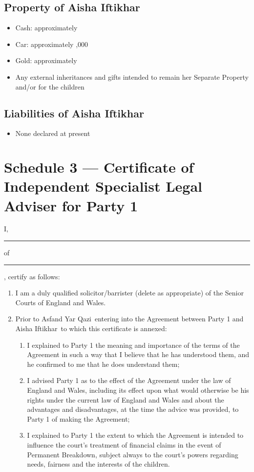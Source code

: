 \documentclass[10pt,a4paper]{article}
\newcommand{\PartyOne}{Asfand Yar Qazi}
\newcommand{\PartyTwo}{Aisha Iftikhar}
\begin{document}
\subsection*{Property of \PartyTwo}
\begin{itemize}[leftmargin=1.8em]
    \item Cash: approximately 
    \item Car: approximately ,000
    \item Gold: approximately 
    \item Any external inheritances and gifts intended to remain her Separate Property and/or for the children
\end{itemize}

\subsection*{Liabilities of \PartyTwo}
\begin{itemize}[leftmargin=1.8em]
    \item None declared at present
\end{itemize}

\newpage
\section*{Schedule 3 --- Certificate of Independent Specialist Legal Adviser for Party 1}

\noindent I, \rule{5cm}{0.4pt} of \rule{8cm}{0.4pt}, certify as follows:

\begin{enumerate}[label=\arabic*., leftmargin=1.8em]
    \item I am a duly qualified solicitor/barrister (delete as appropriate) of the Senior Courts of England and Wales.
    \item Prior to \PartyOne\ entering into the Agreement between Party 1 and \PartyTwo\ to which this certificate is annexed:
    \begin{enumerate}[label=(\alph*), leftmargin=1.8em]
        \item I explained to Party 1 the meaning and importance of the terms of the Agreement in such a way that I believe that he has understood them, and he confirmed to me that he does understand them;
        \item I advised Party 1 as to the effect of the Agreement under the law of England and Wales, including its effect upon what would otherwise be his rights under the current law of England and Wales and about the advantages and disadvantages, at the time the advice was provided, to Party 1 of making the Agreement;
        \item I explained to Party 1 the extent to which the Agreement is intended to influence the court's treatment of financial claims in the event of Permanent Breakdown, subject always to the court's powers regarding needs, fairness and the interests of the children.
    \end{enumerate}
\end{enumerate}
\end{document}
